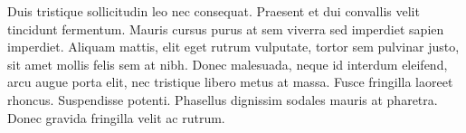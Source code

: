 Duis tristique sollicitudin leo nec consequat. Praesent et dui convallis velit tincidunt fermentum. Mauris cursus purus at sem viverra sed imperdiet sapien imperdiet. Aliquam mattis, elit eget rutrum vulputate, tortor sem pulvinar justo, sit amet mollis felis sem at nibh. Donec malesuada, neque id interdum eleifend, arcu augue porta elit, nec tristique libero metus at massa. Fusce fringilla laoreet rhoncus. Suspendisse potenti. Phasellus dignissim sodales mauris at pharetra. Donec gravida fringilla velit ac rutrum.





\endinput 
